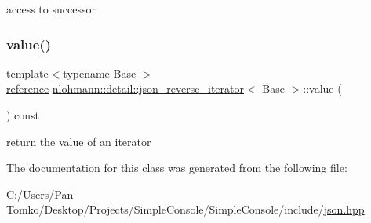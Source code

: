 access to successor 

\mbox{\label{classnlohmann_1_1detail_1_1json__reverse__iterator_ae22803d442d483041d17239615f83b58}} 
\subsubsection{\texorpdfstring{value()}{value()}}
{\footnotesize\ttfamily template$<$typename Base $>$ \\
\mbox{\hyperlink{classnlohmann_1_1detail_1_1json__reverse__iterator_a42f51a69bac7b2aebb613b2164e457f1}{reference}} \mbox{\hyperlink{classnlohmann_1_1detail_1_1json__reverse__iterator}{nlohmann\+::detail\+::json\+\_\+reverse\+\_\+iterator}}$<$ Base $>$\+::value (\begin{DoxyParamCaption}{ }\end{DoxyParamCaption}) const\hspace{0.3cm}{\ttfamily [inline]}}



return the value of an iterator 



The documentation for this class was generated from the following file\+:\begin{DoxyCompactItemize}
\item 
C\+:/\+Users/\+Pan Tomko/\+Desktop/\+Projects/\+Simple\+Console/\+Simple\+Console/include/\mbox{\hyperlink{json_8hpp}{json.\+hpp}}\end{DoxyCompactItemize}
